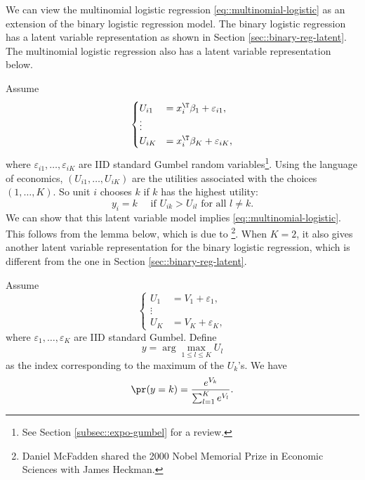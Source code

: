We can view the multinomial logistic regression \eqref{eq::multinomial-logistic} as an extension of the binary logistic regression model. The binary logistic regression has a latent variable representation as shown in Section \ref{sec::binary-reg-latent}. The multinomial logistic regression also has a latent variable representation below.  

Assume
\[
\begin{cases}
U_{i1} & =  x_i^{\T} \beta_1 +\varepsilon_{i1},\\
\vdots\\
U_{iK} & =x_i^{\T} \beta_K +\varepsilon_{iK},
\end{cases}
\]
where $\varepsilon_{i1},\ldots,\varepsilon_{iK}$ are IID  standard Gumbel random variables\footnote{See Section \ref{subsec::expo-gumbel} for a review.}. 
Using the language of economics, $(U_{i1} , \ldots, U_{iK})$ are the utilities associated with the choices $(1,\ldots, K)$. So unit $i$ chooses $k$ if $k$ has the highest utility:
$$
y_i = k  \quad 
\text{ if } 
U_{ik} > U_{il} \text{ for all }
l\neq k.
$$ 
We can show that this latent variable model implies \eqref{eq::multinomial-logistic}. This follows from the lemma below, which is due to \citet{mcfadden1974conditional}\footnote{Daniel McFadden shared the 2000 Nobel Memorial Prize in Economic Sciences with James Heckman.
}. When $K = 2$, it also gives another latent variable representation for the binary logistic regression, which is different from the one in Section \ref{sec::binary-reg-latent}. 





\begin{lemma}
\label{lemma::mcfadden}
Assume
\[
\begin{cases}
U_{1} & =V_{1}+\varepsilon_{1},\\
\vdots\\
U_{K} & =V_{K}+\varepsilon_{K},
\end{cases}
\]
where $\varepsilon_{1},\ldots,\varepsilon_{K}$ are IID standard Gumbel. 
Define
\[
y=\arg\max_{1\leq l\leq K}U_{l}
\]
as the index corresponding to the maximum of the $U_{k}$'s. 
We have
\[
\pr(y=k)=\frac{e^{V_{k}}}{\sum_{l=1}^{K}e^{V_{l}}}.
\]
\end{lemma}


